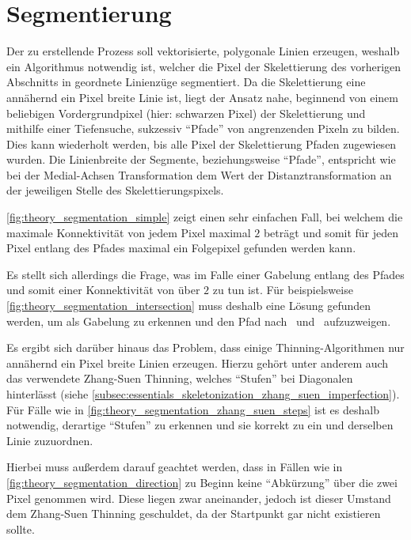\clearpage
\section{Segmentierung}%
\label{sec:theory_segmentation}

Der zu erstellende Prozess soll vektorisierte, polygonale Linien erzeugen, weshalb ein Algorithmus notwendig ist, welcher die Pixel der Skelettierung des vorherigen Abschnitts in geordnete Linienzüge segmentiert.
Da die Skelettierung eine annähernd ein Pixel breite Linie ist, liegt der Ansatz nahe, beginnend von einem beliebigen Vordergrundpixel (hier: schwarzen Pixel) der Skelettierung und mithilfe einer Tiefensuche, sukzessiv \enquote{Pfade} von angrenzenden Pixeln zu bilden.
Dies kann wiederholt werden, bis alle Pixel der Skelettierung Pfaden zugewiesen wurden.
Die Linienbreite der Segmente, beziehungsweise \enquote{Pfade}, entspricht wie bei der Medial-Achsen Transformation dem Wert der Distanztransformation an der jeweiligen Stelle des Skelettierungspixels.

\autoref{fig:theory_segmentation_simple} zeigt einen sehr einfachen Fall, bei welchem die maximale Konnektivität von jedem Pixel maximal \(2\) beträgt und somit für jeden Pixel entlang des Pfades maximal ein Folgepixel gefunden werden kann.

Es stellt sich allerdings die Frage, was im Falle einer Gabelung entlang des Pfades und somit einer Konnektivität von über \(2\) zu tun ist.
Für beispielsweise \autoref{fig:theory_segmentation_intersection} muss deshalb eine Lösung gefunden werden, um  als Gabelung zu erkennen und den Pfad nach ~und~ aufzuzweigen.

Es ergibt sich darüber hinaus das Problem, dass einige Thinning-Algorithmen nur annähernd ein Pixel breite Linien erzeugen.
Hierzu gehört unter anderem auch das verwendete Zhang-Suen Thinning, welches \enquote{Stufen} bei Diagonalen hinterlässt (siehe \autoref{subsec:essentials_skeletonization_zhang_suen_imperfection}).
Für Fälle wie in \autoref{fig:theory_segmentation_zhang_suen_steps} ist es deshalb notwendig, derartige \enquote{Stufen} zu erkennen und sie korrekt zu ein und derselben Linie zuzuordnen.

Hierbei muss außerdem darauf geachtet werden, dass in Fällen wie in \autoref{fig:theory_segmentation_direction} zu Beginn keine \enquote{Abkürzung} über die zwei Pixel  genommen wird.
Diese liegen zwar aneinander, jedoch ist dieser Umstand dem Zhang-Suen Thinning geschuldet, da der Startpunkt gar nicht existieren sollte.

